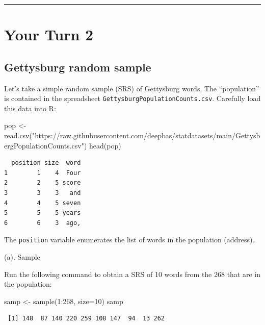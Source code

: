 \documentclass[
]{book}
\newenvironment{Shaded}{\begin{snugshade}}{\end{snugshade}}
\newcommand{\AttributeTok}[1]{\textcolor[rgb]{0.77,0.63,0.00}{#1}}
\newcommand{\DecValTok}[1]{\textcolor[rgb]{0.00,0.00,0.81}{#1}}
\newcommand{\FunctionTok}[1]{\textcolor[rgb]{0.00,0.00,0.00}{#1}}
\newcommand{\NormalTok}[1]{#1}
\newcommand{\OtherTok}[1]{\textcolor[rgb]{0.56,0.35,0.01}{#1}}
\newcommand{\SpecialCharTok}[1]{\textcolor[rgb]{0.00,0.00,0.00}{#1}}
\newcommand{\StringTok}[1]{\textcolor[rgb]{0.31,0.60,0.02}{#1}}
\begin{document}
\begin{center}\rule{0.5\linewidth}{0.5pt}\end{center}

\hypertarget{your-turn-2-1}{%
\section{Your Turn 2}\label{your-turn-2-1}}

\hypertarget{gettysburg-random-sample}{%
\subsection{Gettysburg random sample}\label{gettysburg-random-sample}}

Let's take a simple random sample (SRS) of Gettysburg words. The ``population'' is contained in the
spreadsheet \texttt{GettysburgPopulationCounts.csv}. Carefully load this data into R:

\begin{Shaded}
\begin{Highlighting}[]
\NormalTok{pop }\OtherTok{\textless{}{-}} \FunctionTok{read.csv}\NormalTok{(}\StringTok{"https://raw.githubusercontent.com/deepbas/statdatasets/main/GettysbergPopulationCounts.csv"}\NormalTok{)}
\FunctionTok{head}\NormalTok{(pop)}
\end{Highlighting}
\end{Shaded}

\begin{verbatim}
  position size  word
1        1    4  Four
2        2    5 score
3        3    3   and
4        4    5 seven
5        5    5 years
6        6    3  ago,
\end{verbatim}

The \texttt{position} variable enumerates the list of words in the population (address).

(a). Sample

Run the following command to obtain a SRS of 10 words from the 268 that are in the population:

\begin{Shaded}
\begin{Highlighting}[]
\NormalTok{samp }\OtherTok{\textless{}{-}} \FunctionTok{sample}\NormalTok{(}\DecValTok{1}\SpecialCharTok{:}\DecValTok{268}\NormalTok{, }\AttributeTok{size=}\DecValTok{10}\NormalTok{)}
\NormalTok{samp}
\end{Highlighting}
\end{Shaded}

\begin{verbatim}
 [1] 148  87 140 220 259 108 147  94  13 262
\end{verbatim}
\end{document}
